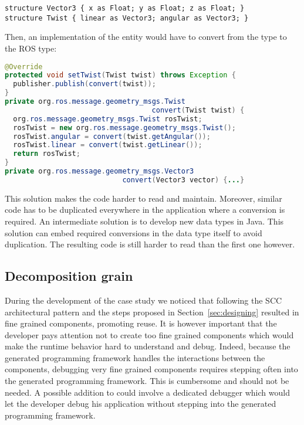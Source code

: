 \begin{lstlisting}[language=diaspec, numbers=none]
structure Vector3 { x as Float; y as Float; z as Float; }
structure Twist { linear as Vector3; angular as Vector3; }
\end{lstlisting}

Then, an implementation of the  entity would have to convert
from the \diaspec{}  type to the ROS  type:

\begin{lstlisting}[language=java, numbers=none]
@Override
protected void setTwist(Twist twist) throws Exception {
  publisher.publish(convert(twist));
}
private org.ros.message.geometry_msgs.Twist
                                   convert(Twist twist) {
  org.ros.message.geometry_msgs.Twist rosTwist;
  rosTwist = new org.ros.message.geometry_msgs.Twist();
  rosTwist.angular = convert(twist.getAngular());
  rosTwist.linear = convert(twist.getLinear());
  return rosTwist;
}
private org.ros.message.geometry_msgs.Vector3
                            convert(Vector3 vector) {...}
\end{lstlisting}

This solution makes the code harder to read and maintain. Moreover,
similar code has to be duplicated everywhere in the application where
a conversion is required. An intermediate solution is to develop new
data types in Java. This solution can embed required conversions in
the data type itself to avoid duplication. The resulting code is still
harder to read than the first one however.

\subsection{Decomposition grain}

During the development of the case study we noticed that following the
SCC architectural pattern and the steps proposed in
Section~\ref{sec:designing} resulted in fine grained components,
promoting reuse. It is however important that the developer pays
attention not to create too fine grained components which would make
the runtime behavior hard to understand and debug. Indeed, because the
generated programming framework handles the interactions between the
components, debugging very fine grained components requires stepping
often into the generated programming framework. This is cumbersome and
should not be needed. A possible addition to \diaspec{} could involve
a dedicated debugger which would let the developer debug his
application without stepping into the generated programming framework.

